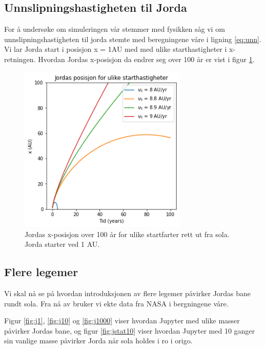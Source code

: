 \documentclass[reprint,english,notitlepage]{revtex4-1}
\begin{document}
\subsection{Unnslipningshastigheten til Jorda}
	For å undersøke om simuleringen vår stemmer med fysikken såg vi om unnslipningshastigheten til jorda stemte med beregningene våre i ligning \ref{eq:unn}. Vi lar Jorda start i posisjon x = 1AU med med ulike starthastigheter i x-retningen. Hvordan Jordas x-posisjon da endrer seg over 100 år er vist i figur \ref{fig:escape}.

	\begin{figure}[H]
		\includegraphics[width=80mm]{../Code/Figures/escape.png}
		\caption{Jordas x-posisjon over 100 år for ulike startfarter rett ut fra sola. Jorda starter ved 1 AU.}
		\label{fig:escape}
	\end{figure}

\subsection{Flere legemer}
	Vi skal nå se på hvordan introduksjonen av flere legemer påvirker Jordas bane rundt sola. Fra nå av bruker vi ekte data fra NASA\cite{NASA} i bergningene våre.
	
	Figur \ref{fig:j1}, \ref{fig:j10} og \ref{fig:j1000} viser hvordan Jupyter med ulike masser påvirker Jordas bane, og figur \ref{fig:jstat10} viser hvordan Jupyter med 10 ganger sin vanlige masse påvirker Jorda når sola holdes i ro i origo.
\end{document}

